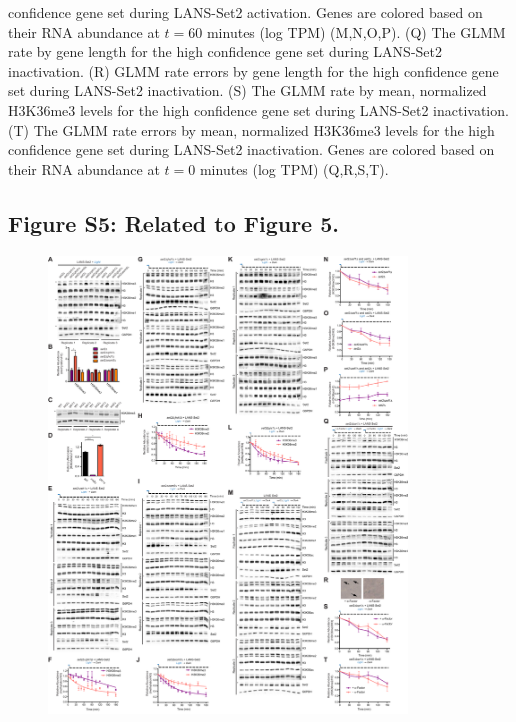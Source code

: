 \documentclass[11pt]{biorxiv}
\begin{document}
confidence gene set during LANS-Set2 activation. Genes are colored based on their RNA abundance at $t=60$ minutes (log TPM) (M,N,O,P). (Q) The GLMM rate by gene length for the high confidence gene set during LANS-Set2 inactivation. (R) GLMM rate errors by gene length for the high confidence gene set during LANS-Set2 inactivation. (S) The GLMM rate by mean, normalized H3K36me3 levels for the high confidence gene set during LANS-Set2 inactivation. (T) The GLMM rate errors by mean, normalized H3K36me3 levels for the high confidence gene set during LANS-Set2 inactivation. Genes are colored based on their RNA abundance at $t=0$ minutes (log TPM) (Q,R,S,T).

\clearpage

\subsection{Figure S5: Related to Figure 5.}
\begin{figure}[ht!]
\center
\includegraphics[width=0.85\textwidth, trim={0in 0in 0in 0in}, clip]{figures/FigS5_reduced2.pdf}
\end{figure}
\end{document}
